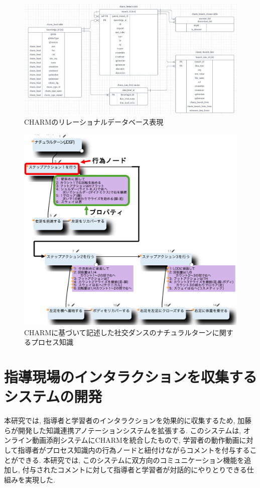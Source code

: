 \begin{figure}[htbp]
    \centering
    \includegraphics[width=1.0\linewidth]{./image/charm_database.png}
    \caption{CHARMのリレーショナルデータベース表現}
    \label{fig2}
\end{figure}

\begin{figure}[htbp]
    \centering
    \includegraphics[width=1.0\linewidth]{./image/charm_natural_turn_2.png}
    \caption{CHARMに基づいて記述した社交ダンスのナチュラルターンに関するプロセス知識}
    \label{fig3}
\end{figure}



\section{指導現場のインタラクションを収集するシステムの開発}
本研究では, 指導者と学習者のインタラクションを効果的に収集するため, 加藤らが開発した知識連携アノテーションシステム\cite{Kato2023}を拡張する. このシステムは, オンライン動画添削システムにCHARMを統合したもので, 学習者の動作動画に対して指導者がプロセス知識内の行為ノードと紐付けながらコメントを付与することができる. 本研究では, このシステムに双方向のコミュニケーション機能を追加し, 付与されたコメントに対して指導者と学習者が対話的にやりとりできる仕組みを実現した. 

